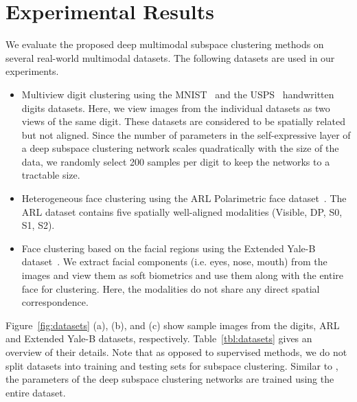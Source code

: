 \documentclass[journal]{IEEEtran}
\begin{document}
       
\section{Experimental Results}
\label{sec:exper}
We evaluate the proposed deep multimodal subspace clustering methods on several real-world multimodal datasets. The following datasets are used in our experiments.  
\begin{itemize}
	\item Multiview digit clustering using the  MNIST~\cite{lecun2010mnist} and the USPS~\cite{hull1994database} handwritten digits datasets.  Here, we view images from the individual datasets as two views of the same digit.	 These datasets are considered to be spatially related but not aligned. Since the number of parameters in the self-expressive layer of a deep subspace clustering network scales quadratically with the size of the data, we randomly select 200 samples per digit to keep the networks to a tractable size. 
	\item Heterogeneous face clustering using the ARL Polarimetric face dataset~\cite{hu2016polarimetric}.  The ARL dataset contains five spatially well-aligned modalities (Visible, DP, S0, S1, S2).  
	\item Face clustering based on the facial regions using the  Extended Yale-B dataset~\cite{9ptsLight}.  We extract facial components (i.e. eyes, nose, mouth) from the images and view them as soft biometrics and use them along with the entire face for clustering.  Here, the modalities do not share any direct  spatial correspondence.
	\end{itemize}
		   
		 Figure~\ref{fig:datasets} (a), (b), and (c) show sample images from the digits, ARL and Extended Yale-B datasets, respectively. Table~\ref{tbl:datasets} gives an overview of their details. Note that as opposed to supervised methods, we do not split datasets into training and testing sets for subspace clustering. Similar to \cite{deepsc17nips}, the parameters of the deep subspace clustering networks are trained using the entire dataset. 
\end{document}
